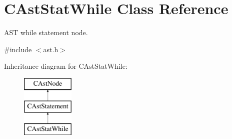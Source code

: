 \hypertarget{classCAstStatWhile}{\section{C\-Ast\-Stat\-While Class Reference}
\label{classCAstStatWhile}
}


A\-S\-T while statement node.  




{\ttfamily \#include $<$ast.\-h$>$}

Inheritance diagram for C\-Ast\-Stat\-While\-:\begin{figure}[H]
\begin{center}
\leavevmode
\includegraphics[height=3.000000cm]{classCAstStatWhile}
\end{center}
\end{figure}
